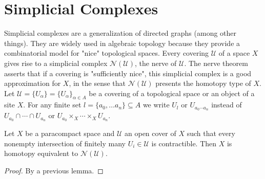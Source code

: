\section{Simplicial Complexes}

Simplicial complexes are a generalization of directed graphs (among other things). They are widely used in algebraic topology because they provide a combinatorial model for "nice" topological spaces. Every covering $\mathcal{U}$ of a space $X$ gives rise to a simplicial complex $\mathcal{N(U)}$, the nerve of $\mathcal{U}$. The nerve theorem asserts that if a covering is "sufficiently nice", this simplicial complex is a good approximation for $X$, in the sense that $\mathcal{N(U)}$ presents the homotopy type of $X$.\\
Let $\mathcal{U} = \{U_\alpha\} = \{U_\alpha\}_{\alpha \in A}$ be a covering of a topological space or an object of a site $X$. For any finite set $l = \{a_0, \dots a_n\} \subseteq A$ we write $U_l$ or $U_{a_0 \cdots a_n}$ instead of $U_{a_0} \cap \cdots \cap U_{a_n}$ or $U_{a_0} \times_X \cdots \times_X U_{a_n}$.



\begin{theorem}
  Let $X$ be a paracompact space and $\mathcal{U}$ an open cover of $X$ such that every nonempty intersection of finitely many $U_i \in \mathcal{U}$ is contractible. Then $X$ is homotopy equivalent to $\mathcal{N(U)}$.
\end{theorem}
\begin{proof}
  By a previous lemma. %

\end{proof}